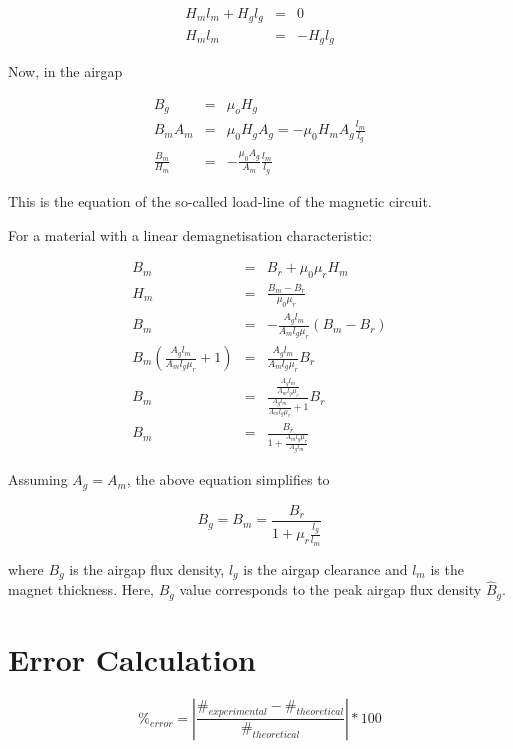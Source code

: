\documentclass[a4paper, 11pt, titlepage]{article}
\begin{document}
\begin{eqnarray}
	H_ml_m + H_gl_g &=& 0 \\
	H_ml_m &=& -H_gl_g
\end{eqnarray}

Now, in the airgap

\begin{eqnarray}
	B_g &=& \mu_oH_g \\
	B_mA_m &=& \mu_0H_gA_g=-\mu_0H_mA_g\frac{l_m}{l_g} \\
	\frac{B_m}{H_m} &=& -\frac{\mu_0A_g}{A_m}\frac{l_m}{l_g}
	\label{label:loadLine}
\end{eqnarray}

This is the equation of the so-called load-line of the magnetic circuit. 

For a material with a linear demagnetisation characteristic:

\begin{eqnarray}
	B_m &=& B_r + \mu_0\mu_rH_m \\
	H_m &=& \frac{B_m-B_r}{\mu_0\mu_r} \\
	B_m &=& -\frac{A_gl_m}{A_ml_g\mu_r}(B_m-B_r) \\
	B_m(\frac{A_gl_m}{A_ml_g\mu_r}+1) &=& \frac{A_gl_m}{A_ml_g\mu_r}B_r \\
	B_m &=& \frac{\frac{A_gl_m}{A_ml_g\mu_r}}{\frac{A_gl_m}{A_ml_g\mu_r}+1}B_r \\
	B_m &=& \frac{B_r}{1+\frac{A_ml_g\mu_r}{A_gl_m}}
	\label{label:demagnetizationCharacteristics}
\end{eqnarray}

Assuming $A_g = A_m$, the above equation simplifies to

\begin{equation}
	B_g = B_m = \frac{B_r}{1+\mu_r\frac{l_g}{l_m}}
\end{equation}

where $B_g$ is the airgap flux density, $l_g$ is the airgap clearance and $l_m$ is the magnet thickness. Here, $B_g$ value corresponds to the peak airgap flux density $\hat{B}_g$. 


\section{Error Calculation}
\label{app:errorCalculation}


\begin{equation}
	\%_{error}=|\frac{\#_{experimental}-\#_{theoretical}}{\#_{theoretical}}|*100
	\label{eq:errorCalculation}
\end{equation}
\end{document}
